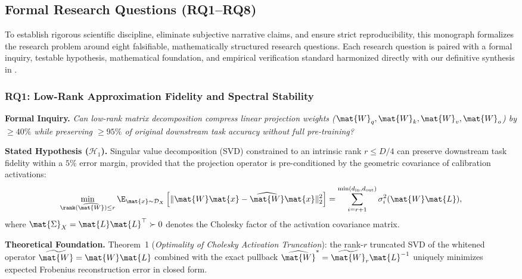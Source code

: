 \subsection{Formal Research Questions (RQ1–RQ8)}
\label{subsec:research_questions}
\label{sec:formal_rqs}

To establish rigorous scientific discipline, eliminate subjective narrative claims, and ensure strict reproducibility, this monograph formalizes the research problem around eight falsifiable, mathematically structured research questions.
Each research question is paired with a formal inquiry, testable hypothesis, mathematical foundation, and empirical verification standard harmonized directly with our definitive synthesis in .

\subsubsection{RQ1: Low-Rank Approximation Fidelity and Spectral Stability}
\label{subsubsec:rq1}

\noindent\textbf{Formal Inquiry.}
\emph{Can low-rank matrix decomposition compress linear projection weights ($\mat{W}_q, \mat{W}_k, \mat{W}_v, \mat{W}_o$) by $\ge 40\%$ while preserving $\ge 95\%$ of original downstream task accuracy without full pre-training?}

\noindent\textbf{Stated Hypothesis ($\mathcal{H}_1$).}
Singular value decomposition (SVD) constrained to an intrinsic rank $r \le D/4$ can preserve downstream task fidelity within a $5\%$ error margin, provided that the projection operator is pre-conditioned by the geometric covariance of calibration activations:
\begin{equation}
\label{eq:rq1_hypothesis}
\min_{\rank(\widehat{\mat{W}}) \le r} \E_{\mat{x} \sim \mathcal{D}_X} \left[ \|\mat{W}\mat{x} - \widehat{\mat{W}}\mat{x}\|_2^2 \right] = \sum_{i=r+1}^{\min(d_{\text{in}}, d_{\text{out}})} \sigma_i^2(\mat{W}\mat{L}),
\end{equation}
where $\mat{\Sigma}_X = \mat{L}\mat{L}^\top \succ 0$ denotes the Cholesky factor of the activation covariance matrix.

\noindent\textbf{Theoretical Foundation.}
Theorem~1 (\emph{Optimality of Cholesky Activation Truncation}): the rank-$r$ truncated SVD of the whitened operator $\widetilde{\mat{W}} = \mat{W}\mat{L}$ combined with the exact pullback $\widehat{\mat{W}}^* = \widetilde{\mat{W}}_r \mat{L}^{-1}$ uniquely minimizes expected Frobenius reconstruction error in closed form.

